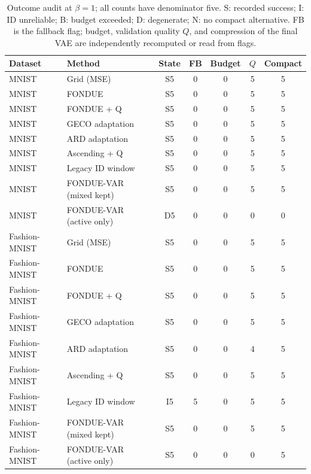 \begin{table}[H]
\caption{Outcome audit at $\beta=1$; all counts have denominator five. S: recorded success; I: ID unreliable; B: budget exceeded; D: degenerate; N: no compact alternative. FB is the fallback flag; budget, validation quality $Q$, and compression of the final VAE are independently recomputed or read from flags.}\label{tab:outcomes0}
\footnotesize
\setlength{\tabcolsep}{3.5pt}
\begin{tabular*}{\textwidth}{@{\extracolsep{\fill}}llccccc@{}}
\toprule
Dataset & Method & State & FB & Budget & $Q$ & Compact \\
\midrule
MNIST & Grid (MSE) & S5 & 0 & 0 & 5 & 5 \\
MNIST & FONDUE & S5 & 0 & 0 & 5 & 5 \\
MNIST & FONDUE + Q & S5 & 0 & 0 & 5 & 5 \\
MNIST & GECO adaptation & S5 & 0 & 0 & 5 & 5 \\
MNIST & ARD adaptation & S5 & 0 & 0 & 5 & 5 \\
MNIST & Ascending + Q & S5 & 0 & 0 & 5 & 5 \\
MNIST & Legacy ID window & S5 & 0 & 0 & 5 & 5 \\
MNIST & FONDUE-VAR (mixed kept) & S5 & 0 & 0 & 5 & 5 \\
MNIST & FONDUE-VAR (active only) & D5 & 0 & 0 & 0 & 0 \\
Fashion-MNIST & Grid (MSE) & S5 & 0 & 0 & 5 & 5 \\
Fashion-MNIST & FONDUE & S5 & 0 & 0 & 5 & 5 \\
Fashion-MNIST & FONDUE + Q & S5 & 0 & 0 & 5 & 5 \\
Fashion-MNIST & GECO adaptation & S5 & 0 & 0 & 5 & 5 \\
Fashion-MNIST & ARD adaptation & S5 & 0 & 0 & 4 & 5 \\
Fashion-MNIST & Ascending + Q & S5 & 0 & 0 & 5 & 5 \\
Fashion-MNIST & Legacy ID window & I5 & 5 & 0 & 5 & 5 \\
Fashion-MNIST & FONDUE-VAR (mixed kept) & S5 & 0 & 0 & 5 & 5 \\
Fashion-MNIST & FONDUE-VAR (active only) & S5 & 0 & 0 & 0 & 5 \\
\bottomrule
\end{tabular*}
\end{table}
